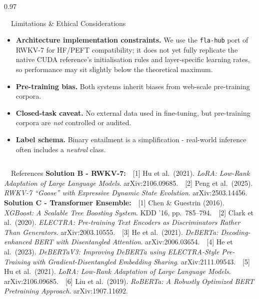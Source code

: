 \documentclass[final,t]{beamer}
\begin{document}
\begin{frame}[t]
\begin{columns}[t,totalwidth=\paperwidth]
\begin{column}{0.97\paperwidth}
\begin{minipage}[t][\bottomrowheight][t]{\solncolwidth}
\begin{block}{\faBalanceScale\ \ Limitations \& Ethical Considerations\vphantom{p} \vphantom{(Dev set)}}
\begin{itemize}
    \item \textbf{Architecture implementation constraints.}
          We use the \texttt{fla-hub} port of RWKV-7 for HF/PEFT
          compatibility; it does not yet fully replicate the
          native CUDA reference's initialisation rules and
          layer-specific learning rates, so performance may sit
          slightly below the theoretical maximum.
    \item \textbf{Pre-training bias.} Both systems inherit biases from web-scale pre-training corpora.
    \item \textbf{Closed-task caveat.} No external data used in
          fine-tuning, but pre-training corpora are \emph{not}
          controlled or audited.
    \item \textbf{Label schema.} Binary entailment is a
          simplification - real-world inference often includes a
          \emph{neutral} class.
\end{itemize}
\end{block}

\vfill
\end{minipage}%
\end{column}
\end{columns}

\noindent
\begin{minipage}{0.97\paperwidth}
\begin{block}{\faBook\ \ References}
\small
\setlength{\parskip}{0.25em}
\textcolor{rwkvBlue}{\textbf{Solution B - RWKV-7:}}\ \
[1] Hu et al.\ (2021). \emph{LoRA: Low-Rank Adaptation of Large Language Models}. arXiv:2106.09685.\ \
[2] Peng et al.\ (2025). \emph{RWKV-7 ``Goose'' with Expressive Dynamic State Evolution}. arXiv:2503.14456.\\
\textcolor{ensembleOrange}{\textbf{Solution C - Transformer Ensemble:}}\ \
[1] Chen \& Guestrin (2016). \emph{XGBoost: A Scalable Tree Boosting System}. KDD '16, pp.\ 785--794.\ \
[2] Clark et al.\ (2020). \emph{ELECTRA: Pre-training Text Encoders as Discriminators Rather Than Generators}. arXiv:2003.10555.\ \
[3] He et al.\ (2021). \emph{DeBERTa: Decoding-enhanced BERT with Disentangled Attention}. arXiv:2006.03654.\ \
[4] He et al.\ (2023). \emph{DeBERTaV3: Improving DeBERTa using ELECTRA-Style Pre-Training with Gradient-Disentangled Embedding Sharing}. arXiv:2111.09543.\ \
[5] Hu et al.\ (2021). \emph{LoRA: Low-Rank Adaptation of Large Language Models}. arXiv:2106.09685.\ \
[6] Liu et al.\ (2019). \emph{RoBERTa: A Robustly Optimized BERT Pretraining Approach}. arXiv:1907.11692.
\end{block}
\end{minipage}


\end{frame}
\end{document}
